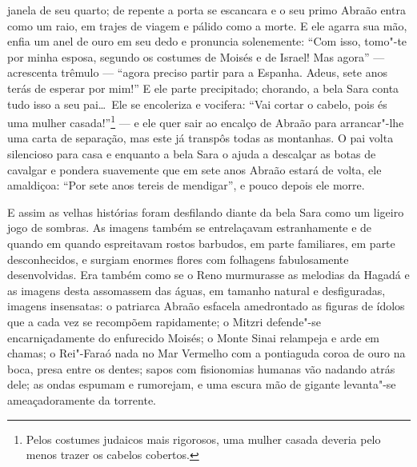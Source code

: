 janela de seu quarto; de repente a porta se escancara e o seu primo
Abraão entra como um raio, em trajes de viagem e pálido como a morte. E
ele agarra sua mão, enfia um anel de ouro em seu dedo e pronuncia
solenemente: ``Com isso, tomo"-te por minha esposa, segundo os costumes
de Moisés e de Israel! Mas agora'' --- acrescenta trêmulo --- ``agora preciso
partir para a Espanha. Adeus, sete anos terás de esperar por mim!'' E
ele parte precipitado; chorando, a bela Sara conta tudo isso a seu
pai\ldots\ Ele se encoleriza e vocifera: ``Vai cortar o cabelo, pois és uma
mulher casada!''\footnote{ Pelos costumes judaicos mais rigorosos, uma mulher 
casada deveria pelo menos trazer os cabelos cobertos.}
 --- e ele quer sair ao encalço de Abraão para arrancar"-lhe uma carta de
separação, mas este já transpôs todas as montanhas. O pai volta
silencioso para casa e enquanto a bela Sara o ajuda a descalçar as
botas de cavalgar e pondera suavemente que em sete anos Abraão estará
de volta, ele amaldiçoa: ``Por sete anos tereis de mendigar'', e pouco
depois ele morre.

E assim as velhas histórias foram desfilando diante da bela Sara como um
ligeiro jogo de sombras. As imagens também se entrelaçavam
estranhamente e de quando em quando espreitavam rostos barbudos, em
parte familiares, em parte desconhecidos, e surgiam enormes flores com
folhagens fabulosamente desenvolvidas. Era também como se o Reno
murmurasse as melodias da Hagadá e as imagens desta assomassem das
águas, em tamanho natural e desfiguradas, imagens insensatas: o
patriarca Abraão esfacela amedrontado as figuras de ídolos que a cada
vez se recompõem rapidamente; o Mitzri defende"-se encarniçadamente do
enfurecido Moisés; o Monte Sinai relampeja e arde em chamas; o
Rei"-Faraó nada no Mar Vermelho com a pontiaguda coroa de ouro na
boca, presa entre os dentes; sapos com fisionomias humanas vão nadando
atrás dele; as ondas espumam e rumorejam, e uma escura mão de gigante
levanta"-se ameaçadoramente da torrente.

